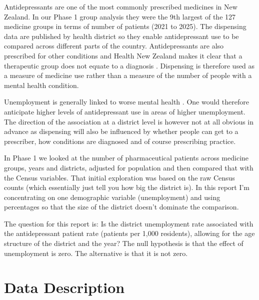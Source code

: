 \documentclass[11pt,a4paper]{article}
\begin{document}
Antidepressants are one of the most commonly prescribed medicines in New Zealand. In our Phase 1 group analysis they were the 9th largest of the 127 medicine groups in terms of number of patients (2021 to 2025). The dispensing data are published by health district so they enable antidepressant use to be compared across different parts of the country. Antidepressants are also prescribed for other conditions and Health New Zealand makes it clear that a therapeutic group does not equate to a diagnosis \cite{hnz}. Dispensing is therefore used as a measure of medicine use rather than a measure of the number of people with a mental health condition.

Unemployment is generally linked to worse mental health \cite{mh}. One would therefore anticipate higher levels of antidepressant use in areas of higher unemployment. The direction of the association at a district level is however not at all obvious in advance as dispensing will also be influenced by whether people can get to a prescriber, how conditions are diagnosed and of course prescribing practice.

In Phase 1 we looked at the number of pharmaceutical patients across medicine groups, years and districts, adjusted for population and then compared that with the Census variables. That initial exploration was based on the raw Census counts (which essentially just tell you how big the district is). In this report I'm concentrating on one demographic variable (unemployment) and using percentages so that the size of the district doesn't dominate the comparison.

The question for this report is: Is the district unemployment rate associated with the antidepressant patient rate (patients per 1,000 residents), allowing for the age structure of the district and the year? The null hypothesis is that the effect of unemployment is zero. The alternative is that it is not zero. 


\section{Data Description}
\end{document}
